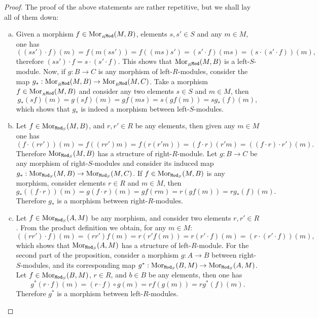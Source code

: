 \begin{proof}
The proof of the above statements are rather repetitive, but we shall lay all of
them down:
\begin{enumerate}[(a)]\setlength\itemsep{0em}
\item Given a morphism \(f \in \operatorname{Mor}_{{{}_{R}\texttt{Mod}}}(M, B)\), elements \(s, s' \in S\)
  and any \(m \in M\), one has
  \[
  ((s s') \cdot f)(m)
  = f(m (s s'))
  = f((m s) s')
  = (s' \cdot f)(m s)
  = (s \cdot (s' \cdot f))(m),
  \]
  therefore \((s s') \cdot f = s \cdot (s' \cdot f)\). This shows that
  \(\operatorname{Mor}_{{{}_{R}\texttt{Mod}}}(M, B)\) is a left-\(S\)-module. Now, if \(g: B \to C\) is
  any morphism of left-\(R\)-modules, consider the map
  \(g_*: \operatorname{Mor}_{{{}_{R}\texttt{Mod}}}(M, B) \to \operatorname{Mor}_{{{}_{R}\texttt{Mod}}}(M, C)\). Take a morphism
  \(f \in \operatorname{Mor}_{{{}_{R}\texttt{Mod}}}(M, B)\) and consider any two elements \(s \in S\) and
  \(m \in M\), then
  \[
  g_{*}(s f)(m) = g (s f)(m) = g f(m s) = s (g f(m)) = s g_{*}(f)(m),
  \]
  which shows that \(g_{*}\) is indeed a morphism between left-\(S\)-modules.

\item Let \(f \in \operatorname{Mor}_{{\texttt{Mod}_{S}}}(M, B)\), and \(r, r' \in R\) be any elements,
  then given any \(m \in M\) one has
  \[
  (f \cdot (r r'))(m)
  = f((r r') m)
  = f(r (r' m))
  = (f \cdot r) (r' m)
  = ((f \cdot r) \cdot r')(m).
  \]
  Therefore \(\operatorname{Mor}_{{\texttt{Mod}_{S}}}(M, B)\) has a structure of right-\(R\)-module. Let
  \(g: B \to C\) be any morphism of right-\(S\)-modules and consider its induced
  map \(g_{*}: \operatorname{Mor}_{{\texttt{Mod}_{S}}}(M, B) \to \operatorname{Mor}_{{\texttt{Mod}_{S}}}(M, C)\). If
  \(f \in \operatorname{Mor}_{{\texttt{Mod}_{S}}}(M, B)\) is any morphism, consider elements
  \(r \in R\) and \(m \in M\), then
  \[
  g_{*}((f \cdot r))(m)
  = g (f \cdot r)(m)
  = g f(r m)
  = r (g f(m))
  = r g_{*}(f)(m).
  \]
  Therefore \(g_{*}\) is a morphism between right-\(R\)-modules.

\item Let \(f \in \operatorname{Mor}_{{\texttt{Mod}_{S}}}(A, M)\) be any morphism, and consider two
  elements \(r, r' \in R\). From the product definition we obtain, for any
  \(m \in M\):
  \[
  ((r r') \cdot f)(m) = (r r') f(m) = r (r' f(m)) = r (r' \cdot f)(m)
  = (r \cdot (r' \cdot f))(m),
  \]
  which shows that \(\operatorname{Mor}_{{\texttt{Mod}_{S}}}(A, M)\) has a structure of
  left-\(R\)-module. For the second part of the proposition, consider a morphism
  \(g: A \to B\) between right-\(S\)-modules, and its corresponding map
  \(g^{*}: \operatorname{Mor}_{{\texttt{Mod}_{S}}}(B, M) \to \operatorname{Mor}_{{\texttt{Mod}_{S}}}(A, M)\). Let \(f \in
  \operatorname{Mor}_{{\texttt{Mod}_{S}}}(B, M)\), \(r \in R\), and \(b \in B\) be any elements, then
  one has
  \[
  g^{*}(r \cdot f)(m)
  = (r \cdot f) \circ g(m)
  = r f(g(m))
  = r g^{*}(f)(m).
  \]
  Therefore \(g^{*}\) is a morphism between left-\(R\)-modules.


\end{enumerate}
\end{proof}
